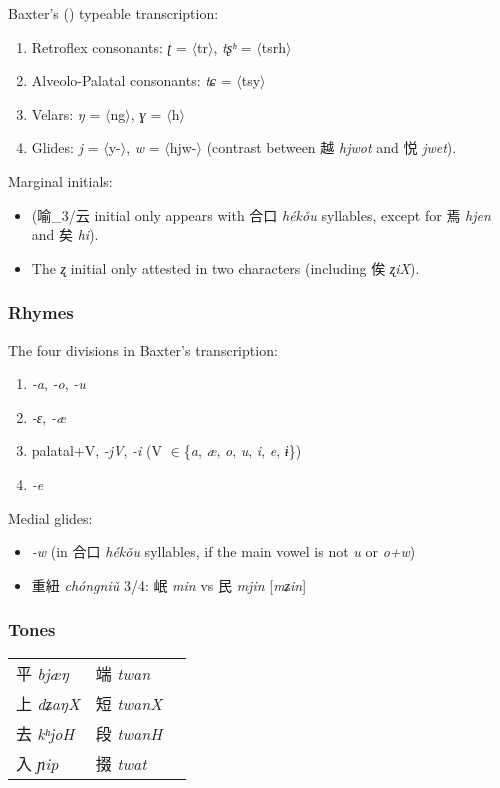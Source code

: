 \documentclass[oneside,a4paper,11pt]{article}
\newcommand{\ipa}[1]{{\phon\textit{#1}}}
\newcommand{\zh}[1]{{\cn #1}}
\newcommand{\zhc}[2]{\zh{#1} \ipa{#2}}
\newcommand{\translit}[1]{$\langle$#1$\rangle$}
\begin{document}
Baxter's (\citeyear{baxter92}) typeable transcription: 
\begin{enumerate}
\item Retroflex consonants: \ipa{ʈ} = \translit{tr}, \ipa{tʂʰ}  =  \translit{tsrh} 
\item Alveolo-Palatal consonants: \ipa{tɕ} = \translit{tsy}
\item Velars: \ipa{ŋ} = \translit{ng}, \ipa{ɣ} = \translit{h}
\item Glides: \ipa{j} = \translit{y-}, \ipa{w} = \translit{hjw-} (contrast between \zhc{越}{hjwot}  and \zhc{悦}{jwet}).
\end{enumerate}

Marginal initials:
\begin{itemize}
\item 
(\zh{喻}_3/\zh{云} initial only appears with \zhc{合口}{hékǒu} syllables, except for \zhc{焉}{hjen} and \zhc{矣}{hi}).
\item The \ipa{ʐ} initial only attested in two characters (including \zhc{俟}{ʐiX}).
\end{itemize}

\subsubsection{Rhymes}

The four divisions in Baxter's transcription:
\begin{enumerate}
\item \ipa{-a}, \ipa{-o}, \ipa{-u}
\item \ipa{-ɛ}, \ipa{-æ}
\item palatal+V, \ipa{-jV}, \ipa{-i} (V $\in$\{\ipa{a}, \ipa{æ}, \ipa{o}, \ipa{u},  \ipa{i}, \ipa{e}, \ipa{ɨ}\})
\item \ipa{-e}
\end{enumerate}

Medial glides:
\begin{itemize}
\item \ipa{-w} (in \zhc{合口}{hékǒu} syllables, if the main vowel is not \ipa{u} or \ipa{o+w})
\item \zhc{重紐}{chóngniǔ} 3/4: \zhc{岷}{min} vs \zhc{民}{mjin} [\ipa{mʑin}]
\end{itemize}

\subsubsection{Tones}

\begin{tabular}{lll} 
\zhc{平}{bjæŋ} & \zhc{端}{twan} \\
\zhc{上}{dʑaŋX} & \zhc{短}{twanX} \\
\zhc{去}{kʰjoH} & \zhc{段}{twanH} \\
\zhc{入}{ɲip} & \zhc{掇}{twat} \\
\end{tabular}
\end{document}
